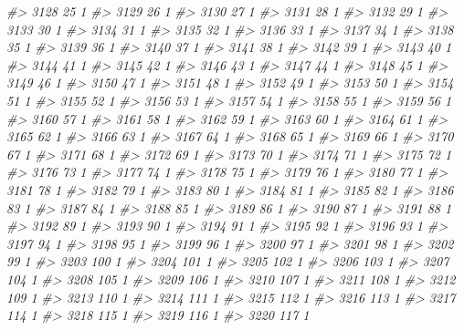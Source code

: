 \documentclass[]{article}
\newenvironment{Shaded}{\begin{snugshade}}{\end{snugshade}}
\newcommand{\CommentTok}[1]{\textcolor[rgb]{0.56,0.35,0.01}{\textit{#1}}}
\begin{document}
\begin{Shaded}
\begin{Highlighting}[]
\CommentTok{#> 3128  25  1}
\CommentTok{#> 3129  26  1}
\CommentTok{#> 3130  27  1}
\CommentTok{#> 3131  28  1}
\CommentTok{#> 3132  29  1}
\CommentTok{#> 3133  30  1}
\CommentTok{#> 3134  31  1}
\CommentTok{#> 3135  32  1}
\CommentTok{#> 3136  33  1}
\CommentTok{#> 3137  34  1}
\CommentTok{#> 3138  35  1}
\CommentTok{#> 3139  36  1}
\CommentTok{#> 3140  37  1}
\CommentTok{#> 3141  38  1}
\CommentTok{#> 3142  39  1}
\CommentTok{#> 3143  40  1}
\CommentTok{#> 3144  41  1}
\CommentTok{#> 3145  42  1}
\CommentTok{#> 3146  43  1}
\CommentTok{#> 3147  44  1}
\CommentTok{#> 3148  45  1}
\CommentTok{#> 3149  46  1}
\CommentTok{#> 3150  47  1}
\CommentTok{#> 3151  48  1}
\CommentTok{#> 3152  49  1}
\CommentTok{#> 3153  50  1}
\CommentTok{#> 3154  51  1}
\CommentTok{#> 3155  52  1}
\CommentTok{#> 3156  53  1}
\CommentTok{#> 3157  54  1}
\CommentTok{#> 3158  55  1}
\CommentTok{#> 3159  56  1}
\CommentTok{#> 3160  57  1}
\CommentTok{#> 3161  58  1}
\CommentTok{#> 3162  59  1}
\CommentTok{#> 3163  60  1}
\CommentTok{#> 3164  61  1}
\CommentTok{#> 3165  62  1}
\CommentTok{#> 3166  63  1}
\CommentTok{#> 3167  64  1}
\CommentTok{#> 3168  65  1}
\CommentTok{#> 3169  66  1}
\CommentTok{#> 3170  67  1}
\CommentTok{#> 3171  68  1}
\CommentTok{#> 3172  69  1}
\CommentTok{#> 3173  70  1}
\CommentTok{#> 3174  71  1}
\CommentTok{#> 3175  72  1}
\CommentTok{#> 3176  73  1}
\CommentTok{#> 3177  74  1}
\CommentTok{#> 3178  75  1}
\CommentTok{#> 3179  76  1}
\CommentTok{#> 3180  77  1}
\CommentTok{#> 3181  78  1}
\CommentTok{#> 3182  79  1}
\CommentTok{#> 3183  80  1}
\CommentTok{#> 3184  81  1}
\CommentTok{#> 3185  82  1}
\CommentTok{#> 3186  83  1}
\CommentTok{#> 3187  84  1}
\CommentTok{#> 3188  85  1}
\CommentTok{#> 3189  86  1}
\CommentTok{#> 3190  87  1}
\CommentTok{#> 3191  88  1}
\CommentTok{#> 3192  89  1}
\CommentTok{#> 3193  90  1}
\CommentTok{#> 3194  91  1}
\CommentTok{#> 3195  92  1}
\CommentTok{#> 3196  93  1}
\CommentTok{#> 3197  94  1}
\CommentTok{#> 3198  95  1}
\CommentTok{#> 3199  96  1}
\CommentTok{#> 3200  97  1}
\CommentTok{#> 3201  98  1}
\CommentTok{#> 3202  99  1}
\CommentTok{#> 3203 100  1}
\CommentTok{#> 3204 101  1}
\CommentTok{#> 3205 102  1}
\CommentTok{#> 3206 103  1}
\CommentTok{#> 3207 104  1}
\CommentTok{#> 3208 105  1}
\CommentTok{#> 3209 106  1}
\CommentTok{#> 3210 107  1}
\CommentTok{#> 3211 108  1}
\CommentTok{#> 3212 109  1}
\CommentTok{#> 3213 110  1}
\CommentTok{#> 3214 111  1}
\CommentTok{#> 3215 112  1}
\CommentTok{#> 3216 113  1}
\CommentTok{#> 3217 114  1}
\CommentTok{#> 3218 115  1}
\CommentTok{#> 3219 116  1}
\CommentTok{#> 3220 117  1}

\end{Highlighting}
\end{Shaded}
\end{document}
